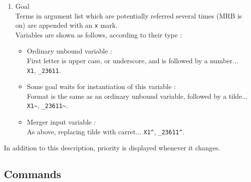 \begin{enumerate}
\item Goal\\
Terms in argument list which are potentially referred several times
(MRB is on) are appended with an \verb|x| mark.\\
Variables are shown as follows, according to their type :
\begin{itemize}
\item Ordinary unbound variable :\\
First letter is upper case, or underscore, and is followed by a number...
\verb|X1|, \verb|_23611|.
\item Some goal waits for instantiation of this variable :\\
Format is the same as an ordinary unbound variable, followed by a tilde...
\verb|X1~|, \verb|_23611~|.
\item Merger input variable :\\
As above, replacing tilde with carret...
\verb|X1^|, \verb|_23611^|.
\end{itemize}
\end{enumerate}

In addition to this description, priority is displayed whenever it changes.

\subsection{Commands}


